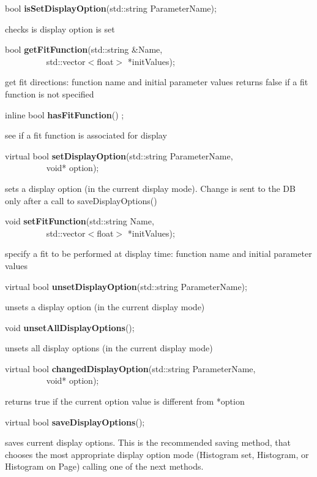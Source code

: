 \item    bool {\bf isSetDisplayOption}(std::string ParameterName);


 checks is display option is set


\item    bool {\bf getFitFunction}(std::string \&Name,\\\mbox{}~~~~~~~~~ std::vector$<$float$>$ *initValues);


 get fit directions: function name and initial parameter values
 returns false if a fit function is not specified


\item    inline bool {\bf hasFitFunction}() ;

 see if a fit function is associated for display


\item    virtual bool {\bf setDisplayOption}(std::string ParameterName,\\\mbox{}~~~~~~~~~ void* option);


 sets a display option (in the current display mode). Change is sent to the DB only 
 after a call to saveDisplayOptions()


\item    void {\bf setFitFunction}(std::string Name,\\\mbox{}~~~~~~~~~ std::vector$<$float$>$ *initValues);


 specify a fit to be performed at display time: function name and initial parameter values


\item    virtual bool {\bf unsetDisplayOption}(std::string ParameterName);


 unsets a display option (in the current display mode)


\item    void {\bf unsetAllDisplayOptions}();


 unsets all display options (in the current display mode)


\item    virtual bool {\bf changedDisplayOption}(std::string ParameterName,\\\mbox{}~~~~~~~~~ 
				    void* option);

 returns true if the current option value is different from *option


\item    virtual bool {\bf saveDisplayOptions}();


 saves current display options.  This is the recommended saving method, that
 chooses the most appropriate display option mode 
 (Histogram set, Histogram, or Histogram on Page) calling one of the next methods.



